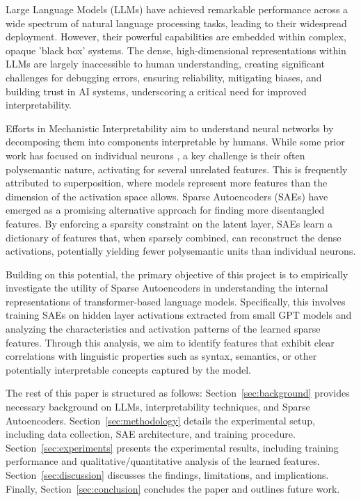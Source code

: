 \documentclass{article}
\begin{document}
Large Language Models (LLMs) have achieved remarkable performance across a wide spectrum of natural language processing tasks, leading to their widespread deployment. However, their powerful capabilities are embedded within complex, opaque 'black box' systems. The dense, high-dimensional representations within LLMs are largely inaccessible to human understanding, creating significant challenges for debugging errors, ensuring reliability, mitigating biases, and building trust in AI systems, underscoring a critical need for improved interpretability.

Efforts in Mechanistic Interpretability aim to understand neural networks by decomposing them into components interpretable by humans. While some prior work has focused on individual neurons \cite{Olahet al., 2020; Bills et al., 2023}, a key challenge is their often polysemantic nature, activating for several unrelated features. This is frequently attributed to superposition, where models represent more features than the dimension of the activation space allows. Sparse Autoencoders (SAEs) \cite{Cunningham et al., 2023} have emerged as a promising alternative approach for finding more disentangled features. By enforcing a sparsity constraint on the latent layer, SAEs learn a dictionary of features that, when sparsely combined, can reconstruct the dense activations, potentially yielding fewer polysemantic units than individual neurons.

Building on this potential, the primary objective of this project is to empirically investigate the utility of Sparse Autoencoders in understanding the internal representations of transformer-based language models. Specifically, this involves training SAEs on hidden layer activations extracted from small GPT models and analyzing the characteristics and activation patterns of the learned sparse features. Through this analysis, we aim to identify features that exhibit clear correlations with linguistic properties such as syntax, semantics, or other potentially interpretable concepts captured by the model.

The rest of this paper is structured as follows: Section~\ref{sec:background} provides necessary background on LLMs, interpretability techniques, and Sparse Autoencoders. Section~\ref{sec:methodology} details the experimental setup, including data collection, SAE architecture, and training procedure. Section~\ref{sec:experiments} presents the experimental results, including training performance and qualitative/quantitative analysis of the learned features. Section~\ref{sec:discussion} discusses the findings, limitations, and implications. Finally, Section~\ref{sec:conclusion} concludes the paper and outlines future work.
\end{document}
